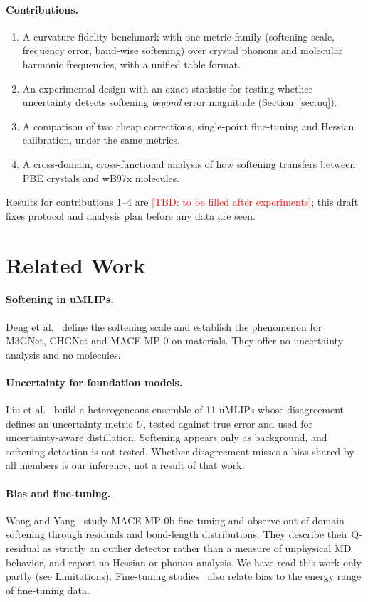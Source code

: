 \documentclass{article}
\newcommand{\TBD}[1]{\textcolor{red}{[TBD: #1]}}
\begin{document}
\paragraph{Contributions.}
\begin{enumerate}
\item A curvature-fidelity benchmark with one metric family (softening scale, frequency error, band-wise softening) over crystal phonons and molecular harmonic frequencies, with a unified table format.
\item An experimental design with an exact statistic for testing whether uncertainty detects softening \emph{beyond} error magnitude (Section~\ref{sec:uq}).
\item A comparison of two cheap corrections, single-point fine-tuning and Hessian calibration, under the same metrics.
\item A cross-domain, cross-functional analysis of how softening transfers between PBE crystals and wB97x molecules.
\end{enumerate}
Results for contributions 1--4 are \TBD{to be filled after experiments}; this draft fixes protocol and analysis plan before any data are seen.

\section{Related Work}\label{sec:related}
\paragraph{Softening in uMLIPs.} Deng et al.~\cite{deng2025softening} define the softening scale and establish the phenomenon for M3GNet, CHGNet and MACE-MP-0 on materials. They offer no uncertainty analysis and no molecules.

\paragraph{Uncertainty for foundation models.} Liu et al.~\cite{hetero2025} build a heterogeneous ensemble of 11 uMLIPs whose disagreement defines an uncertainty metric $U$, tested against true error and used for uncertainty-aware distillation. Softening appears only as background, and softening detection is not tested. Whether disagreement misses a bias shared by all members is our inference, not a result of that work.

\paragraph{Bias and fine-tuning.} Wong and Yang~\cite{wong2026bias} study MACE-MP-0b fine-tuning and observe out-of-domain softening through residuals and bond-length distributions. They describe their Q-residual as strictly an outlier detector rather than a measure of unphysical MD behavior, and report no Hessian or phonon analysis. We have read this work only partly (see Limitations). Fine-tuning studies~\cite{finetunetutorial2025,finetunestudy2025} also relate bias to the energy range of fine-tuning data.
\end{document}
